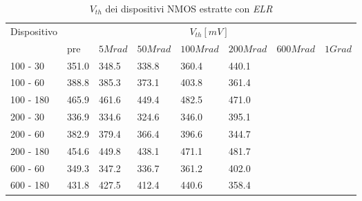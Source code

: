 \documentclass[12pt, letterpaper]{book}
\begin{document}
\begin{table}[H]
  \renewcommand{\arraystretch}{1.3}
    \begin{tabular}{m{2cm} m{0.8cm} m{1.1cm} m{1.3cm} m{1.5cm} m{1.5cm} m{1.5cm} m{1cm}}
      \toprule
      \multirow{2}{*}{Dispositivo} & \multicolumn{7}{c}{$V_{th} [mV] $}                                                                    \\
      \cmidrule{2-8}
                                   & pre  			& $5Mrad$ & $50Mrad$ & $100Mrad$ & $200Mrad$ & $600Mrad$ & $1Grad$ \\
      \midrule
      100 - 30                 	& 351.0      		& 348.5		& 338.8     	& 360.4 		& 440.1     	&      	&    \\
      \hline
      100 - 60                  	& 388.8            	& 385.3   	& 373.1   	& 403.8  	& 361.4     	&      	&    \\
	\hline
      100 - 180               	& 465.9          	& 461.6		& 449.4    	& 482.5    	& 471.0    	&     	&    \\
      \hline
      200 - 30 			& 336.9          	& 334.6   	& 324.6   	& 346.0    	& 395.1     	&    		&    \\
      \hline
      200 - 60                  	& 382.9			& 379.4  	& 366.4    	& 396.6    	& 344.7   	&     	&    \\
      \hline
      200 - 180                 	& 454.6     		& 449.8   	&438.1   	& 471.1   	& 481.7    	&      	&    \\
      \hline
      600 - 60              	& 349.3          	& 347.2    	&336.7    	& 361.2      	& 402.0    	&       	&    \\
      \hline
      600 - 180                	& 431.8             	& 427.5    	&412.4    	& 440.6     	& 358.4     	&       	&    \\
      \bottomrule
    \end{tabular}
  \caption{$V_{th}$ dei dispositivi NMOS estratte con \emph{ELR}}
  \label{tab:VthELRN}
\end{table}
\end{document}
